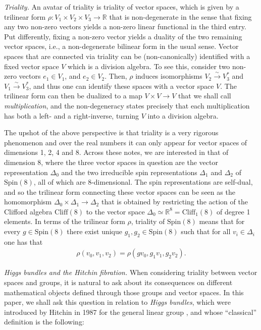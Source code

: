 \documentclass[pdftex]{sigma}
\numberwithin{equation}{section}
\begin{document}
{\it Triality.} An avatar of triality is triality of vector spaces, which is given by a trilinear form
$\rho\colon V_{1}\times V_{2}\times V_{3}\to \mathbb{R}$ that is non-degenerate in the sense that fixing any two non-zero vectors yields a non-zero linear functional in the third entry. Put differently, fixing a non-zero vector yields a duality of the two remaining vector spaces, i.e., a non-degenerate bilinear form in the usual sense. Vector spaces that are connected via triality can be (non-canonically) identified with a fixed vector space $V$ which is a division algebra. To see this, consider two non-zero vectors $e_1 \in V_1$, and $e_2 \in V_2$. Then, $\rho$ induces isomorphisms $V_2 \xrightarrow{\sim} V_3^\ast$ and $V_1 \xrightarrow{\sim} V_3^\ast$, and thus one can identify these spaces with a vector space $V$. The trilinear form can then be dualized to a map $V \times V \to V$ that we shall call \textit{multiplication}, and the non-degeneracy states precisely that each multiplication has both a left- and a right-inverse, turning $V$ into a division algebra.

The upshot of the above perspective is that triality is a very rigorous phenomenon and over the real numbers it can only appear for vector spaces of dimensions 1, 2, 4 and 8. Across these notes, we are interested in that of dimension 8, where the three vector spaces in question are the vector representation $\Delta_0$ and the two irreducible spin representations $\Delta_1$ and $\Delta_2$ of $\mathrm{Spin}(8)$, all of which are 8-dimensional. The spin representations are self-dual, and so the trilinear form connecting these vector spaces can be seen as the homomorphism $\Delta_0 \times \Delta_1 \to \Delta_2$ that is obtained by restricting the action of the Clifford algebra $\mathrm{Cliff}(8)$ to the vector space $\Delta_0 \simeq \mathbb{R}^8 = \mathrm{Cliff}_1(8)$ of degree 1 elements.
In terms of the trilinear form $\rho$, triality of $\mathrm{Spin}(8)$ means that for every $g \in \mathrm{Spin}(8)$ there exist unique $g_1, g_2 \in \mathrm{Spin}(8)$ such that for all $v_i \in \Delta_i$ one has that
\begin{eqnarray} \rho(v_0, v_1, v_2) = \rho (g v_0, g_1 v_1, g_2 v_2). \label{ecu11}
\end{eqnarray}

{\it Higgs bundles and the Hitchin fibration.} When considering triality between vector spaces and groups, it is natural to ask about its consequences on different mathematical objects defined through those groups and vector spaces. In this paper, we shall ask this question in relation to {\it Higgs bundles}, which were introduced by Hitchin in 1987 for the general linear group \cite{N1}, and whose ``classical'' definition is the following:
\end{document}
